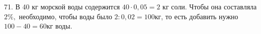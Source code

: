 71. В 40 кг морской воды содержится $40\cdot0,05=2$ кг соли. Чтобы она составляла $2\%,$ необходимо, чтобы воды было $2:0,02=100$кг, то есть добавить нужно $100-40=60$кг воды.\\
